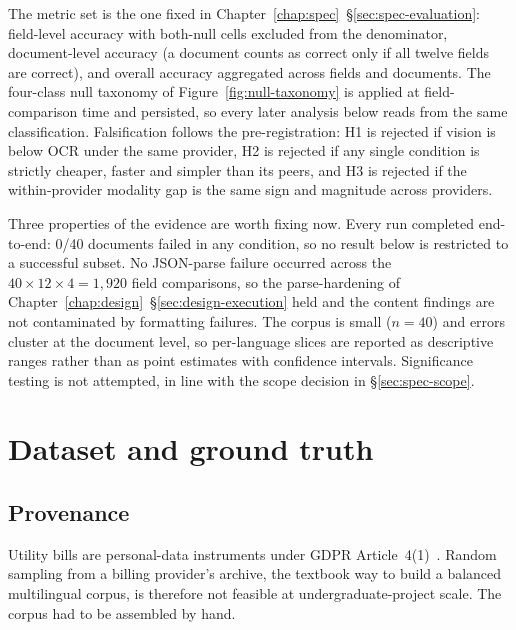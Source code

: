 The metric set is the one fixed in
Chapter~\ref{chap:spec}~\S\ref{sec:spec-evaluation}: field-level
accuracy with both-null cells excluded from the denominator,
document-level accuracy (a document counts as correct only if all
twelve fields are correct), and overall accuracy aggregated across
fields and documents. The four-class null taxonomy of
Figure~\ref{fig:null-taxonomy} is applied at field-comparison time
and persisted, so every later analysis below reads from the same
classification. Falsification follows the pre-registration: H1 is
rejected if vision is below OCR under the same provider, H2 is
rejected if any single condition is strictly cheaper, faster and
simpler than its peers, and H3 is rejected if the within-provider
modality gap is the same sign and magnitude across providers.

Three properties of the evidence are worth fixing now. Every run
completed end-to-end: 0/40 documents failed in any condition, so no
result below is restricted to a successful subset. No JSON-parse
failure occurred across the $40\times 12\times 4 = 1{,}920$ field
comparisons, so the parse-hardening of
Chapter~\ref{chap:design}~\S\ref{sec:design-execution} held and the
content findings are not contaminated by formatting failures. The
corpus is small ($n=40$) and errors cluster at the document level,
so per-language slices are reported as descriptive ranges rather than
as point estimates with confidence intervals. Significance testing is
not attempted, in line with the scope decision in
\S\ref{sec:spec-scope}.

\section{Dataset and ground truth}
\label{sec:eval-dataset}

\subsection{Provenance}
\label{sec:eval-dataset-provenance}

Utility bills are personal-data instruments under GDPR
Article~4(1)~\cite{eu2016gdpr}. Random sampling from a billing
provider's archive, the textbook way to build a balanced
multilingual corpus, is therefore not feasible at
undergraduate-project scale. The corpus had to be assembled by hand.

